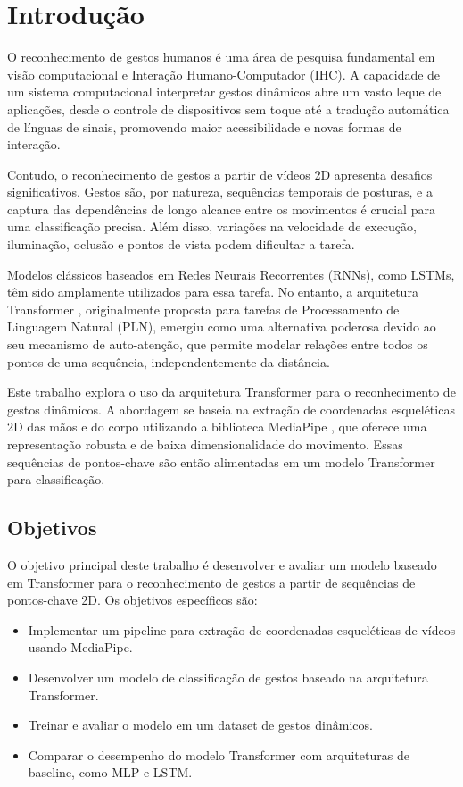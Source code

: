 \documentclass[
	a4paper,      %
	12pt,         %
	english,      %
	oneside,      %
	openany       %
]{abntex2}
\begin{document}
\chapter{Introdução}
\label{chap:introducao}

O reconhecimento de gestos humanos é uma área de pesquisa fundamental em visão computacional e Interação Humano-Computador (IHC). A capacidade de um sistema computacional interpretar gestos dinâmicos abre um vasto leque de aplicações, desde o controle de dispositivos sem toque até a tradução automática de línguas de sinais, promovendo maior acessibilidade e novas formas de interação.

Contudo, o reconhecimento de gestos a partir de vídeos 2D apresenta desafios significativos. Gestos são, por natureza, sequências temporais de posturas, e a captura das dependências de longo alcance entre os movimentos é crucial para uma classificação precisa. Além disso, variações na velocidade de execução, iluminação, oclusão e pontos de vista podem dificultar a tarefa.

Modelos clássicos baseados em Redes Neurais Recorrentes (RNNs), como LSTMs, têm sido amplamente utilizados para essa tarefa. No entanto, a arquitetura Transformer \cite{vaswani2017attention}, originalmente proposta para tarefas de Processamento de Linguagem Natural (PLN), emergiu como uma alternativa poderosa devido ao seu mecanismo de auto-atenção, que permite modelar relações entre todos os pontos de uma sequência, independentemente da distância.

Este trabalho explora o uso da arquitetura Transformer para o reconhecimento de gestos dinâmicos. A abordagem se baseia na extração de coordenadas esqueléticas 2D das mãos e do corpo utilizando a biblioteca MediaPipe \cite{lugaresi2019mediapipe}, que oferece uma representação robusta e de baixa dimensionalidade do movimento. Essas sequências de pontos-chave são então alimentadas em um modelo Transformer para classificação.

\section{Objetivos}

O objetivo principal deste trabalho é desenvolver e avaliar um modelo baseado em Transformer para o reconhecimento de gestos a partir de sequências de pontos-chave 2D. Os objetivos específicos são:
\begin{itemize}
    \item Implementar um pipeline para extração de coordenadas esqueléticas de vídeos usando MediaPipe.
    \item Desenvolver um modelo de classificação de gestos baseado na arquitetura Transformer.
    \item Treinar e avaliar o modelo em um dataset de gestos dinâmicos.
    \item Comparar o desempenho do modelo Transformer com arquiteturas de baseline, como MLP e LSTM.
\end{itemize}
\end{document}
